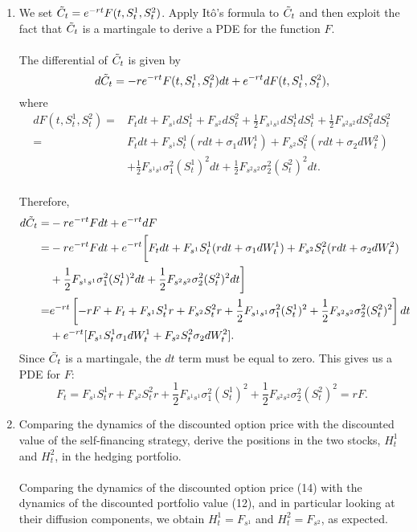 \documentclass[11pt,a4,table]{article}
\begin{document}
\begin{enumerate}
\begin{enumerate}
        \item We set $\Tilde{C}_t = e^{-rt}F(t,S_t^1, S_t^2)$. Apply Itô's formula to $\Tilde{C}_t$ and then exploit the fact that $\Tilde{C}_t$ is a martingale to derive a PDE for the function $F$.\\\\
        The differential of $\Tilde{C}_t$ is given by
        \begin{equation*}
            d\Tilde{C}_t = -re^{-rt}F(t,S_t^1,S_t^2) dt + e^{-rt} dF(t,S_t^1, S_t^2),
        \end{equation*}
        where
        \begin{align*}
            dF(t,S_t^1,S_t^2) = &F_t dt + F_{s^1} dS_t^1 + F_{s^2} dS_t^2 + \frac{1}{2}F_{s^1s^1} dS_t^1dS_t^1 + \frac{1}{2}F_{s^2s^2} dS_t^2dS_t^2\\
            = &F_t dt + F_{s^1}S_t^1(r dt + \sigma_1 dW_t^1) + F_{s^2}S_t^2(r dt + \sigma_2 dW_t^2)\\
            &+\frac{1}{2}F_{s^1s^1}\sigma_1^2(S_t^1)^2 dt + \frac{1}{2}F_{s^2s^2}\sigma_2^2(S_t^2)^2 dt.
        \end{align*}\\
        Therefore,
        \begin{align}
            d\Tilde{C}_t = &-re^{-rt}F dt + e^{-rt} dF \nonumber\\
            = &-re^{-rt}F dt + e^{-rt}\bigg[F_t dt + F_{s^1}S_t^1(r dt + \sigma_1 dW_t^1) + F_{s^2}S_t^2(r dt + \sigma_2 dW_t^2) \nonumber\\
            &+\frac{1}{2}F_{s^1s^1}\sigma_1^2(S_t^1)^2 dt + \frac{1}{2}F_{s^2s^2}\sigma_2^2(S_t^2)^2 dt\bigg] \nonumber\\
            = &e^{-rt}\left[-rF + F_t + F_{s^1}S_t^1r + F_{s^2}S_t^2r + \frac{1}{2}F_{s^1s^1}\sigma_1^2(S_t^1)^2 + \frac{1}{2}F_{s^2s^2}\sigma_2^2(S_t^2)^2 \right] dt \nonumber\\
            &+e^{-rt}[F_{s^1}S_t^1\sigma_1 dW_t^1 + F_{s^2}S_t^2\sigma_2 dW_t^2].
        \end{align}
        Since $\Tilde{C}_t$ is a martingale, the $dt$ term must be equal to zero. This gives us a PDE for $F$:
        \begin{equation*}
            F_t = F_{s^1}S_t^1r + F_{s^2}S_t^2r + \frac{1}{2}F_{s^1s^1}\sigma_1^2(S_t^1)^2 + \frac{1}{2}F_{s^2s^2}\sigma_2^2(S_t^2)^2 = rF.
        \end{equation*}
        
        \item Comparing the dynamics of the discounted option price with the discounted value of the self-financing strategy, derive the positions in the two stocks, $H_t^1$ and $H_t^2$, in the hedging portfolio.\\\\
        Comparing the dynamics of the discounted option price (14) with the dynamics of the discounted portfolio value (12), and in particular looking at their diffusion components, we obtain $H_t^1=F_{s^1}$ and $H_t^2=F_{s^2}$, as expected.
    \end{enumerate}
    
    
\end{enumerate}
\end{document}
